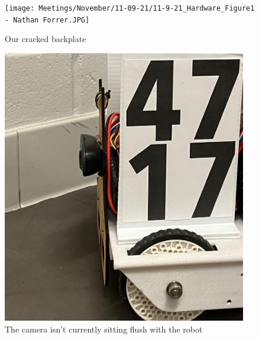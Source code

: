 \begin{figure}[ht]
\centering
\begin{minipage}[b]{.48\textwidth}
  \centering
  \texttt{[image: Meetings/November/11-09-21/11-9-21\_Hardware\_Figure1 - Nathan Forrer.JPG]}
  \caption{Our cracked backplate}
  \label{fig:pic1}
\end{minipage}%
\hfill%
\begin{minipage}[b]{.48\textwidth}
  \centering
  \includegraphics[width=0.95\textwidth]{Meetings/November/11-09-21/11-9-21_Hardware_Figure2 - Nathan Forrer.JPG}
  \caption{The camera isn't currently sitting flush with the robot}
  \label{fig:pic2}
\end{minipage}
\end{figure}

